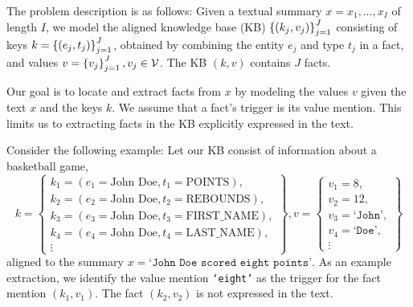 \documentclass[12pt]{article}
\begin{document}
\begin{comment}
Note on related work:
Except for \citet{zeng2018copy}, prior work has either assumed that the locations of
entities and values are given as input features or that the locations of entities and values
are observed at training time.
\end{comment}

The problem description is as follows:
Given a textual summary $x = x_1, \ldots, x_{I}$ of length $I$,
we model the aligned knowledge base (KB) $\left\{(k_j, v_j)\right\}_{j=1}^J$
consisting of keys $k = \left\{(e_j, t_j)\right\}_{j=1}^J$, 
obtained by combining the entity $e_j$ and type $t_j$ in a fact,
and values $v = \left\{v_j\right\}_{j=1}^J, v_j \in \mathcal{V}$.
The KB $(k,v)$ contains $J$ facts.

Our goal is to locate and extract facts from $x$ by modeling the values $v$
given the text $x$ and the keys $k$.
We assume that a fact's trigger is its value mention.
This limits us to extracting facts in the KB explicitly expressed in the text.

\begin{comment}
Modeling only the KB $(k,v)$ given the text $x$
is not sufficient, as our goal is to locate fact mentions.
We assume the KB contains many more facts than those mentioned in the text.
This fits many scenarios in real world applications:
We may have many entity and type key pairs in our KB,
but a summary may discuss only a small, salient subset of players and statistics.
We therefore propose a model that first identifies words as value mentions,
aligns those mentions to an entity and relation type in order to obtain a fact, 
and then aggregates word-level decisions into a sequence-level decision to resolve conflicts.
\end{comment}

Consider the following example:
Let our KB consist of information about a basketball game,
$$
k = \left\{\begin{array}{c}
    k_1 = (e_1 = \textrm{John Doe}, t_1 = \textrm{POINTS}), \\
    k_2 = (e_2 = \textrm{John Doe}, t_2 = \textrm{REBOUNDS}), \\
    k_3 = (e_3 = \textrm{John Doe}, t_3 = \textrm{FIRST\_NAME}),\\
    k_4 = (e_4 = \textrm{John Doe}, t_4 = \textrm{LAST\_NAME}), \\
    \vdots
\end{array}\right\},
v = \left\{\begin{array}{c}
v_1 = 8,\\
v_2 = 12,\\
v_3 = \texttt{`John'},\\
v_4 = \texttt{`Doe'},\\
\vdots 
\end{array}\right\}
$$
aligned to the summary $x = \texttt{`John Doe scored eight points'}$.
As an example extraction, we identify the value mention
\texttt{`eight'} as the trigger for the fact mention $(k_1, v_1)$.
The fact $(k_2,v_2)$ is not expressed in the text.
\end{document}
